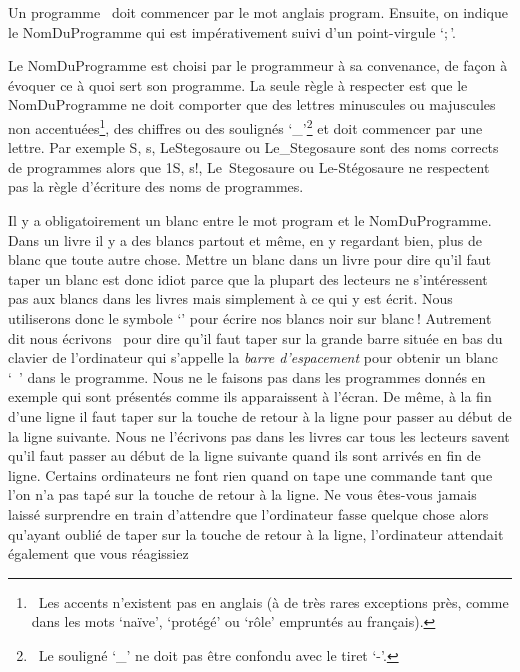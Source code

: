 Un programme \pascal\ doit commencer par le mot anglais {\mcl program}. 
Ensuite, on indique le {\idt  NomDuProgramme} qui est 
impérativement suivi d'un point-virgule `$;$'. 

Le {\idt  NomDuProgramme} est choisi par le programmeur
à sa convenance, de façon à évoquer ce à quoi sert son programme.
 La seule règle à res\-pec\-ter est que le {\idt  NomDuProgramme}
ne doit comporter que des lettres minuscules ou
majuscules non accentuées\footnote{\ Les accents n'existent pas en anglais
(à de très rares exceptions près, comme dans les mots `naïve', `protégé' ou
`rôle' empruntés au français).}, des chiffres ou
des soulignés `\_'\footnote{\ Le souligné `\_' ne doit pas être confondu avec le tiret `-'.}
et doit commencer par une lettre. Par exemple {\idt  S}, 
{\idt  s}, {\idt  LeStegosaure} ou {\idt  Le\_Stegosaure} sont des noms corrects de
programmes alors que {\idt  1S}, 
{\idt  s!}, {\idt  Le\ Stegosaure} ou {\idt  Le-Stégosaure} ne respectent
pas la règle d'écriture des noms de programmes. 

Il y a obligatoirement un blanc
entre le mot {\mcl program} et le {\idt  Nom\-Du\-Pro\-gram\-me}. Dans un livre il y a des blancs partout et même, en y regardant bien,
plus de blanc que toute autre chose. Mettre un blanc dans un livre pour dire qu'il faut taper
un blanc est donc idiot parce que la plupart des lecteurs ne s'intéressent pas aux 
blancs dans les livres mais simplement à ce qui y est écrit.
Nous utiliserons donc le symbole `\blanc' pour écrire nos blancs noir sur \hbox{blanc$\:$!}
Autrement dit nous écrivons \blanc\ pour dire qu'il faut taper sur la grande barre 
située en bas du clavier de l'or\-di\-na\-teur qui s'appelle la 
{\em barre d'espacement}
pour obtenir un blanc `\ ' dans le programme. 
Nous ne le faisons pas dans les programmes donnés en exemple qui sont
présentés comme ils apparaissent à l'écran. De même, à la fin d'une 
ligne il faut taper sur la touche de retour à la ligne 
\framebox[11.mm][l]{$\hookleftarrow$~~~} pour passer au début de la
ligne suivante. Nous ne l'écrivons pas dans les livres car tous les lecteurs savent
qu'il faut passer au début de la ligne suivante quand ils sont arrivés en fin de ligne. 
Certains or\-di\-na\-teurs ne font rien quand on tape une commande tant que l'on n'a pas
tapé sur la touche de retour à la ligne. Ne vous êtes-vous jamais laissé
surprendre en train d'attendre que l'or\-di\-na\-teur fasse quelque chose alors qu'ayant 
oublié de taper sur la touche de retour à la ligne, l'or\-di\-na\-teur 
attendait également que
vous \hbox{réagissiez$\:$}

